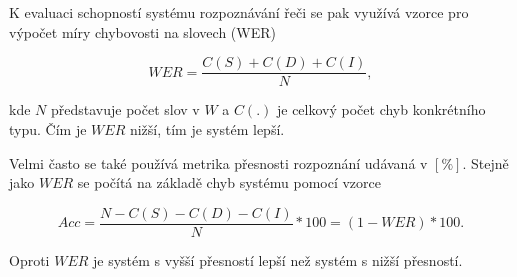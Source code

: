 \noindent K evaluaci schopností systému rozpoznávání řeči se pak využívá vzorce pro výpočet míry chybovosti na slovech (WER)

\begin{equation}
  WER = \frac{C(S) + C(D) + C(I)}{N},
  \label{eq:asr:decoding:wer}
\end{equation}

\noindent kde $N$ představuje počet slov v $\hat{W}$ a $C(.)$ je celkový počet chyb konkrétního typu. Čím je $WER$ nižší, tím je systém lepší.

Velmi často se také používá metrika přesnosti rozpoznání udávaná v $[\%]$. Stejně jako $WER$ se počítá na základě chyb systému pomocí vzorce

\begin{equation}
  Acc = \frac{N - C(S) - C(D) - C(I)}{N} * 100 = \left(1 - WER\right) * 100.
  \label{eq:asr:decoding:acc}
\end{equation}

\noindent Oproti $WER$ je systém s vyšší přesností lepší než systém s nižší přesností.

